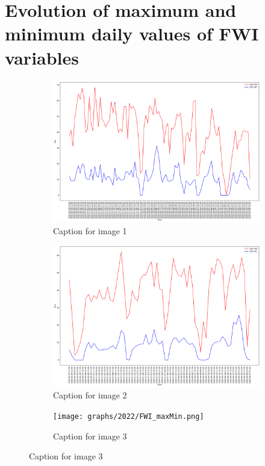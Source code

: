\section{Evolution of maximum and minimum daily values of FWI variables}
\begin{figure}[h]
	\centering
	\caption{Caption for the whole figure}
	\begin{subfigure}{0.3\textwidth}
		\centering
		\includegraphics[width=\textwidth]{graphs/2015/byHour/FWI_maxMin.png}
		\caption{Caption for image 1}
		\label{fig:img1}
	\end{subfigure}
	\hfill
	\begin{subfigure}{0.3\textwidth}
		\centering
		\includegraphics[width=\textwidth]{graphs/2019/byHour/FWI_maxMin.png}
		\caption{Caption for image 2}
		\label{fig:img2}
	\end{subfigure}
	\hfill
	\begin{subfigure}{0.3\textwidth}
		\centering
		\texttt{[image: graphs/2022/FWI\_maxMin.png]}
		\caption{Caption for image 3}
		\label{fig:img3}
	\end{subfigure}
	
	\label{fig:all_images}
\end{figure}

